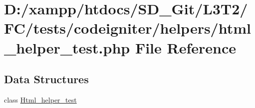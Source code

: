 \hypertarget{html__helper__test_8php}{}\section{D\+:/xampp/htdocs/\+S\+D\+\_\+\+Git/\+L3\+T2/\+F\+C/tests/codeigniter/helpers/html\+\_\+helper\+\_\+test.php File Reference}
\label{html__helper__test_8php}
\subsection*{Data Structures}
\begin{DoxyCompactItemize}
\item 
class \hyperlink{class_html__helper__test}{Html\+\_\+helper\+\_\+test}
\end{DoxyCompactItemize}
